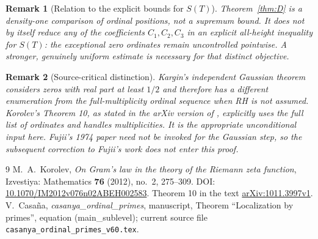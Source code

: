 \documentclass[11pt,a4paper]{article}
\newtheorem{remark}{Remark}
\begin{document}
\begin{remark}[Relation to the explicit bounds for $S(T)$]
Theorem~\ref{thm:D} is a \emph{density-one} comparison of ordinal positions, not a supremum bound. It does not by itself reduce any of the coefficients $C_1,C_2,C_3$ in an explicit all-height inequality for $S(T)$: the exceptional zero ordinates remain uncontrolled pointwise. A stronger, genuinely uniform estimate is necessary for that distinct objective.
\end{remark}
\begin{remark}[Source-critical distinction]
Kargin's independent Gaussian theorem considers zeros with real part at least $1/2$ and therefore has a different enumeration from the full-multiplicity ordinal sequence when RH is not assumed. Korolev's \emph{Theorem 10}, as stated in the arXiv version of \cite{Korolev2012}, explicitly uses the full list of ordinates and handles multiplicities. It is the appropriate unconditional input here. Fujii's 1974 paper need not be invoked for the Gaussian step, so the subsequent correction to Fujii's work does not enter this proof.
\end{remark}
\begin{thebibliography}{9}
 M.~A.~Korolev, \emph{On Gram's law in the theory of the Riemann zeta function}, Izvestiya: Mathematics \textbf{76} (2012), no.~2, 275--309. DOI: \href{https://doi.org/10.1070/IM2012v076n02ABEH002583}{10.1070/IM2012v076n02ABEH002583}. Theorem 10 in the text \href{https://arxiv.org/abs/1011.3997}{arXiv:1011.3997v1}.
 V.~Casa\~na, \emph{casanya\_ordinal\_primes}, manuscript, Theorem ``Localization by primes'', equation (main\_sublevel); current source file \texttt{casanya\_ordinal\_primes\_v60.tex}.
\end{thebibliography}
\end{document}
